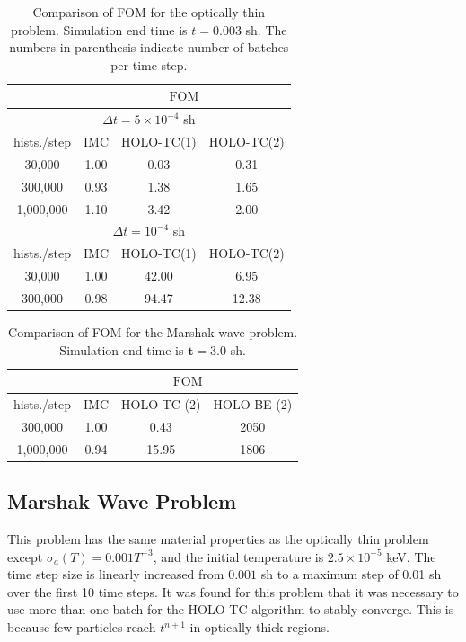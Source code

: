 \documentclass{anstrans}
\newcommand{\FOM}{\ensuremath{\text{FOM}}}
\begin{document}
\begin{table}[H]
\centering
\caption{\label{tab:fom_thin} {Comparison of FOM for the optically
    thin problem.  Simulation end time is $t=0.003$ sh. The numbers in parenthesis indicate number of
batches per time step.}}
\begin{tabular}{|c|ccc|}\cline{2-4}
    \multicolumn{1}{c|}{}       &
    \multicolumn{3}{|c|}{\FOM} \\ \hline
    \multicolumn{4}{|c|}{$\Delta t = 5\times10^{-4}$ sh} \\\hline
hists./step   &   IMC   & HOLO-TC(1) & HOLO-TC(2) \\ \hline
   30,000     &   1.00  & 0.03  &  0.31      \\
  300,000     &   0.93  & 1.38  &  1.65     \\ 
  1,000,000   &   1.10  & 3.42  &  2.00      \\ \hline
    \multicolumn{4}{|c|}{$\Delta t = 10^{-4}$ sh} \\\hline
hists./step   &  IMC   & HOLO-TC(1) & HOLO-TC(2) \\ \hline
   30,000     &  1.00  &  42.00    & 6.95    \\
  300,000     &  0.98  &  94.47    & 12.38    \\ \hline
\end{tabular}
\end{table}
\begin{table}[H]
\centering
\caption{\label{tab:marshak_cont} {Comparison of FOM for the Marshak
    wave problem.  Simulation end time is $\mathbf{t=3.0}$ sh.}}
\begin{tabular}{|c|ccc|}\cline{2-4}
    \multicolumn{1}{c|}{}        &
    \multicolumn{3}{|c|}{\FOM} \\ \hline
hists./step    &  IMC   & HOLO-TC (2) & HOLO-BE (2) \\ \hline
  300,000      &  1.00  &   0.43    & 2050          \\  
  1,000,000    &  0.94  &  15.95    & 1806          \\ \hline
\end{tabular}
\end{table}

\subsection{Marshak Wave Problem}

This problem has the same material properties as the optically thin problem except
$\sigma_a(T) = 0.001 T^{-3}$, and the initial temperature is $2.5\times10^{-5}$ keV.  The time step size is linearly increased from $0.001$ sh to a
maximum step of 0.01 sh over the first 10 time steps.  It was found for this problem that it was
necessary to use more than one batch for the HOLO-TC algorithm to stably converge.
This is because few particles reach $t^{n+1}$ in optically
thick regions.
\end{document}
